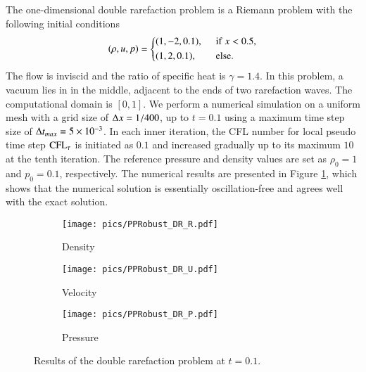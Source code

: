 The one-dimensional double rarefaction problem \cite{hu2004kineticDoubleRare}
is a Riemann problem with the following initial conditions
\begin{equation}
    (\rho,u,p) = \begin{dcases}
        (1,-2,0.1),\ \  & \mathrm{if} \ x < 0.5,       \\
        (1,2,0.1),\ \   & \mathrm{else}.
    \end{dcases}
\end{equation}
The flow is inviscid and the ratio of specific heat is $\gamma=1.4$.
In this problem, a vacuum lies in in the middle, adjacent to the ends of two rarefaction waves.
The computational domain is $[0,1]$.
We perform a numerical simulation on a uniform mesh with a grid size of $\mathrm\Delta x = 1/400$, up to $t=0.1$ using a maximum time step size of $\mathrm\Delta t_{max}= 5 \times 10 ^{-3}$.
In each inner iteration, the CFL number for local pseudo time step $\text{CFL}_\tau$ is initiated as $0.1$ and
increased gradually up to its maximum $10$ at the tenth iteration.
The reference pressure and density values are set as $\rho_0=1$ and $p_0=0.1$, respectively.
The numerical results are presented in Figure \ref{fig:doubleRare}, which shows that the numerical solution is essentially oscillation-free and agrees well with the exact solution.

\begin{figure}[htbp]
    \centering
    \begin{subfigure}{0.33\textwidth}
        \texttt{[image: pics/PPRobust\_DR\_R.pdf]}
        \caption[]{Density}
    \end{subfigure}\hfill
    \begin{subfigure}{0.33\textwidth}
        \texttt{[image: pics/PPRobust\_DR\_U.pdf]}
        \caption[]{Velocity}
    \end{subfigure}\hfill
    \begin{subfigure}{0.33\textwidth}
        \texttt{[image: pics/PPRobust\_DR\_P.pdf]}
        \caption[]{Pressure}
    \end{subfigure}
    \caption{Results of the double rarefaction problem at $t=0.1$.}
    \label{fig:doubleRare}
\end{figure}




